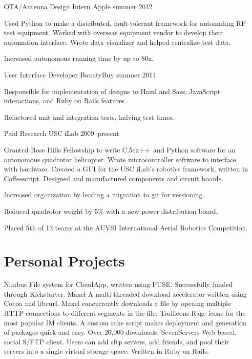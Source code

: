 \documentclass[print]{friggeri-cv}
\newenvironment{itemize*}%
  {\begin{itemize}%
    \setlength{\itemsep}{0pt}%
    \setlength{\parskip}{0pt}}%
  {\end{itemize}}
\def\Cplusplus{{\rm C\raise.5ex\hbox{\small ++}}~}
\begin{document}
\workexperience
  {OTA/Antenna Design Intern}
  {Apple}
  {summer 2012}
  {
  Used Python to make a distributed, fault-tolerant framework for automating RF test equipment. Worked with overseas equipment vendor to develop their automation interface. Wrote data visualizer and helped centralize test data.
  \begin{itemize*}
    \item Increased autonomous running time by up to 80x.
  \end{itemize*}
  }

\workexperience
  {User Interface Developer}
  {BountyBuy}
  {summer 2011}
  {
  Responsible for implementation of designs to Haml and Sass, JavaScript interactions, and Ruby on Rails features.
  \begin{itemize*}
    \item Refactored unit and integration tests, halving test times.
  \end{itemize*}
  }

\workexperience
  {Paid Research}
  {USC iLab}
  {2009--present}
  {
  Granted Rose Hills Fellowship to write \Cplusplus and Python software for an autonomous quadrotor helicopter. Wrote microcontroller software to interface with hardware. Created a GUI for the USC iLab's robotics framework, written in Coffeescript. Designed and manufactured components and circuit boards.
  \begin{itemize*}
    \item Increased organization by leading a migration to git for versioning.
    \item Reduced quadrotor weight by 5\% with a new power distribution board.
    \item Placed 5th of 13 teams at the AUVSI International Aerial Robotics Competition.
  \end{itemize*}
  }

\section{Personal Projects}

\begin{entrylist}
  \project
    {Nimbus}
    {File system for CloudApp, written using FUSE. Successfully funded through Kickstarter.}
  \project
    {Maxel}
    {A multi-threaded download accelerator written using Cocoa and libcurl. Maxel concurrently downloads a file by opening multiple HTTP connections to different segments in the file.}
  \project
    {Trollicons}
    {Rage icons for the most popular IM clients. A custom rake script makes deployment and generation of packages quick and easy. Over 20,000 downloads.}
  \project
    {SevenServers}
    {Web-based, social S/FTP client. Users can add sftp servers, add friends, and pool their servers into a single virtual storage space. Written in Ruby on Rails.}
\end{entrylist}

\nopagebreak
\end{document}
